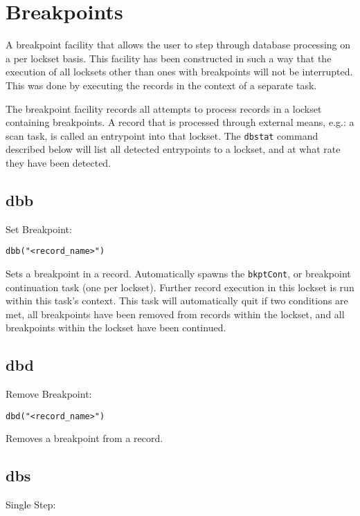 \section{Breakpoints}

A breakpoint facility that allows the user to step through database processing on a per lockset basis. This facility has been 
constructed in such a way that the execution of all locksets other than ones with breakpoints will not be interrupted. This 
was done by executing the records in the context of a separate task.

The breakpoint facility records all attempts to process records in a lockset containing breakpoints. A record that is 
processed through external means, e.g.: a scan task, is called an entrypoint into that lockset. The \verb|dbstat| command 
described below will list all detected entrypoints to a lockset, and at what rate they have been detected.

\subsection{dbb}

Set Breakpoint:

\begin{verbatim}dbb("<record_name>")
\end{verbatim}Sets a breakpoint in a record. Automatically spawns the \verb|bkptCont|, or breakpoint continuation task (one per lockset). 
Further record execution in this lockset is run within this task's context. This task will automatically quit if two conditions 
are met, all breakpoints have been removed from records within the lockset, and all breakpoints within the lockset have 
been continued.

\subsection{dbd}

Remove Breakpoint:

\begin{verbatim}dbd("<record_name>")
\end{verbatim}Removes a breakpoint from a record.

\subsection{dbs}

Single Step:

